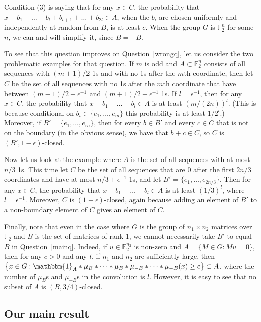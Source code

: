 \documentclass[11pt]{article}
\numberwithin{equation}{section}
\theoremstyle{definition}
\theoremstyle{plain}
\newcommand{\expref}[2]{\hyperref[#2]{#1~\ref{#2}}}
\newcommand\eps{\epsilon}  %
\newcommand\F{\mathbb{F}}
\newcommand{\ind}{\mathbbm{1}}
\renewcommand\AA{\ind_A}
\newcommand \s{\subset}
\begin{document}
\noindent Condition (3) is saying that for any $x\in C$, the probability that $x-b_1-\dots-b_l+b_{l+1}+\dots+b_{2l}\in A$, when the $b_i$ are chosen uniformly and independently at random from $B$, is at least $c$. When the group $G$ is $\F_2^n$ for some $n$, we can and will simplify it, since $B=-B$.

To see that this question improves on \expref{Question}{wrongq}, let us consider the two problematic examples for that question. If $m$ is odd and $A\subset\F_2^n$ consists of all sequences with $(m\pm 1)/2$ 1s and with no 1s after the $m$th coordinate, then let $C$ be the set of all sequences with no 1s after the $m$th coordinate that have between $(m-1)/2-\eps^{-1}$ and $(m+1)/2+\eps^{-1}$ 1s. If $l=\eps^{-1}$, then for any $x\in C$, the probability that $x-b_1-\dots-b_l\in A$ is at least $({m}/{(2n)})^l$. (This is because conditional on $b_i\in \{e_1,\dots,e_m\}$ this probability is at least ${1}/{2^l}$.) Moreover, if $B'=\{e_1,\dots,e_m\}$, then for every $b\in B'$ and every $c\in C$ that is not on the boundary (in the obvious sense), we have that $b+c\in C$, so $C$ is  $(B',1-\eps)$-closed.

Now let us look at the example where $A$ is the set of all sequences with at most $n/3$ 1s. This time let $C$ be the set of all sequences that are 0 after the first $2n/3$ coordinates and have at most $n/3+\eps^{-1}$ 1s, and let $B'=\{e_1,\dots,e_{2n/3}\}$. Then for any $x\in C$, the probability that $x-b_1-\dots-b_l\in A$ is at least $({1}/{3})^l$, where $l=\eps^{-1}$. Moreover, $C$ is  $(1-\eps)$-closed, again because adding an element of $B'$ to a non-boundary element of $C$ gives an element of $C$.

%
Finally, note that even in the case where $G$ is the group of $n_1\times n_2$ matrices over $\F_2$ and $B$ is the set of matrices of rank 1, we cannot necessarily take $B'$ to equal $B$ in \expref{Question}{mainq}. Indeed, if $u\in \F_2^{n_2}$ is non-zero and $A=\{M\in G: Mu=0\}$, then for any $c>0$ and any $l$, if $n_1$ and $n_2$ are sufficiently large, then $\bigl\{x\in G: \AA*\mu_B*\dots*\mu_B*\mu_{-B}*\dots*\mu_{-B}(x)\geq c\bigr\}\s A$, where the number of $\mu_B$s and $\mu_{-B}$s in the convolution is $l$. However, it is easy to see that no subset of $A$ is $(B,3/4)$-closed.

\subsection{Our main result}
\end{document}
